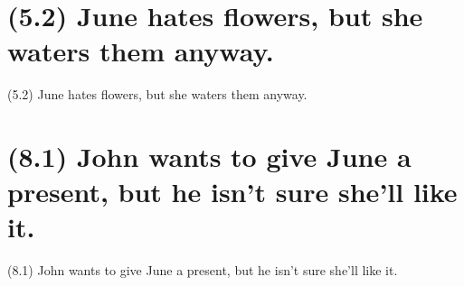 \documentclass{article}
\begin{document}
\section*{(5.2) June hates flowers, but she waters them anyway.}

\bigbreak
\begin{enumerate*}
\item[(5.2)] June hates flowers, but she waters them anyway.
\end{enumerate*}
\bigbreak

\bigbreak
\begin{minipage}{\textwidth}
\end{minipage}
\bigbreak

\clearpage

%
%

\section*{(8.1) John wants to give June a present, but he isn't sure she’ll like it.}

\bigbreak
\begin{enumerate*}
\item[(8.1)] John wants to give June a present, but he isn't sure she’ll like it.
\end{enumerate*}
\bigbreak

\bigbreak
\begin{minipage}{\textwidth}
\end{minipage}
\bigbreak
\end{document}
